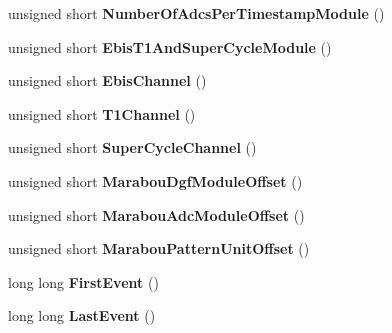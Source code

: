 \begin{DoxyCompactItemize}
\item 
\hypertarget{class_global_settings_aa749f02a0a70decee11846ba3ceb044c}{unsigned short {\bfseries Number\-Of\-Adcs\-Per\-Timestamp\-Module} ()}\label{class_global_settings_aa749f02a0a70decee11846ba3ceb044c}

\item 
\hypertarget{class_global_settings_a71ac24fe36fc3f7cc2844bdfedb2ea72}{unsigned short {\bfseries Ebis\-T1\-And\-Super\-Cycle\-Module} ()}\label{class_global_settings_a71ac24fe36fc3f7cc2844bdfedb2ea72}

\item 
\hypertarget{class_global_settings_af9cbfd6c5cd67d7efb49f7c23ef4320b}{unsigned short {\bfseries Ebis\-Channel} ()}\label{class_global_settings_af9cbfd6c5cd67d7efb49f7c23ef4320b}

\item 
\hypertarget{class_global_settings_a02d32bf705627b6d8e878ee1e6c69912}{unsigned short {\bfseries T1\-Channel} ()}\label{class_global_settings_a02d32bf705627b6d8e878ee1e6c69912}

\item 
\hypertarget{class_global_settings_a6395f10d579a2fb086f72979322a9ca3}{unsigned short {\bfseries Super\-Cycle\-Channel} ()}\label{class_global_settings_a6395f10d579a2fb086f72979322a9ca3}

\item 
\hypertarget{class_global_settings_a8f3ef06ff28b68746bb18833c343bc15}{unsigned short {\bfseries Marabou\-Dgf\-Module\-Offset} ()}\label{class_global_settings_a8f3ef06ff28b68746bb18833c343bc15}

\item 
\hypertarget{class_global_settings_a2bffff3342768138d92eb4bba965de8f}{unsigned short {\bfseries Marabou\-Adc\-Module\-Offset} ()}\label{class_global_settings_a2bffff3342768138d92eb4bba965de8f}

\item 
\hypertarget{class_global_settings_a3a66dee38bb8974fe42269881f58e6f4}{unsigned short {\bfseries Marabou\-Pattern\-Unit\-Offset} ()}\label{class_global_settings_a3a66dee38bb8974fe42269881f58e6f4}

\item 
\hypertarget{class_global_settings_adaf6b3cb383cea55ee595422baf2d6a4}{long long {\bfseries First\-Event} ()}\label{class_global_settings_adaf6b3cb383cea55ee595422baf2d6a4}

\item 
\hypertarget{class_global_settings_ac34c73a865be96c6c21edcf6f99fc35e}{long long {\bfseries Last\-Event} ()}\label{class_global_settings_ac34c73a865be96c6c21edcf6f99fc35e}


\end{DoxyCompactItemize}

